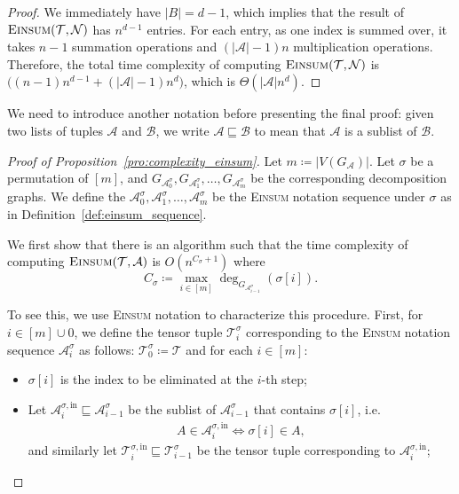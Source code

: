 \documentclass[twoside,11pt]{article}
\def\Einsum{\textsc{Einsum}}
\newcommand{\tensorcontraction}{\textsc{Einsum}}
\newcommand{\degp}[2]{\deg_{#2}(#1)}
\newcommand{\verticesp}[1]{V(#1)}
\newcommand{\graphform}[1]{G_{#1}}
\newcommand{\less}{O}
\newcommand{\appequal}{\Theta}
\def\calN{\mathcal{N}}
\def\calA{\mathcal{A}}
\def\calB{\mathcal{B}}
\def\calT{\mathcal{T}}
\begin{document}
\begin{proof}
We immediately have $|B| = d - 1$, which implies that the result of $\tensorcontraction(\calT, \calN)$ has $n^{d-1}$ entries. For each entry, as one index is summed over, it takes $n-1$ summation operations and $(|\calA|-1)n$ multiplication operations. Therefore, the total time complexity of computing $\tensorcontraction(\calT, \calN)$ is $\big((n-1)n^{d-1} + (|\calA|-1)n^d\big)$, which is $\appequal(|\calA|n^{d})$. 
\end{proof}

We need to introduce another notation before presenting the final proof: given two lists of tuples $\calA$ and $\calB$, we write $\calA \sqsubseteq \calB$ to mean that $\calA$ is a sublist of $\calB$.

\begin{proof}[Proof of Proposition~\ref{pro:complexity_einsum}]    
Let $m \coloneqq |\verticesp{G_\calA}|$. Let $\sigma$ be a permutation of $[m]$, and $\graphform{\calA^{\sigma}_0}, \graphform{\calA^{\sigma}_1}, \ldots, \graphform{\calA^{\sigma}_m}$ be the corresponding decomposition graphs. We define the $\calA^{\sigma}_0, \calA^{\sigma}_1, \ldots, \calA^{\sigma}_m$ be the \Einsum{} notation sequence under $\sigma$ as in Definition~\ref{def:einsum_sequence}.
    
We first show that there is an algorithm such that the time complexity of computing $\tensorcontraction(\calT, \calA)$ is $\less(n^{C_\sigma + 1}) $ where
\begin{equation*}
C_\sigma \coloneqq \max_{i \in [m]} \degp{\sigma[i]}{\graphform{\calA^{\sigma}_{i-1}}}.
\end{equation*}

To see this, we use \Einsum{} notation to characterize this procedure. First, for $i \in [m] \cup {0}$, we define the tensor tuple $\calT^\sigma_i$ corresponding to the \Einsum{} notation sequence $\calA^\sigma_i$ as follows: $\calT^{\sigma}_{0} \coloneqq \calT$ and for each $i \in [m]$:
\begin{itemize}
    \item $\sigma[i]$ is the index to be eliminated at the $i$-th step;
    \item Let $\calA^{\sigma, \mathrm{in}}_i \sqsubseteq \calA^{\sigma}_{i-1}$ be the sublist of $\calA^{\sigma}_{i-1}$ that contains $\sigma[i]$, i.e.
    \begin{align*}
    A \in \calA^{\sigma, \mathrm{in}}_i \iff \sigma[i] \in A,
    \end{align*}
    and similarly let $\calT^{\sigma, \mathrm{in}}_i \sqsubseteq \calT^{\sigma}_{i-1}$ be the tensor tuple corresponding to $\calA^{\sigma, \mathrm{in}}_i $;
    

\end{itemize}
\end{proof}
\end{document}
